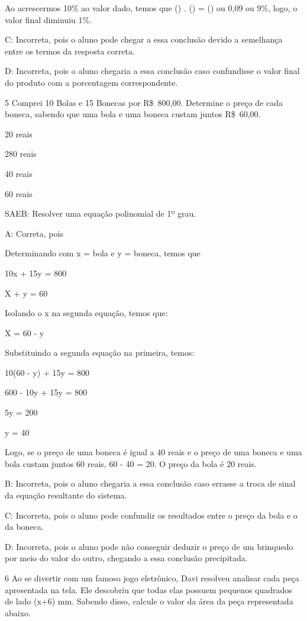 {Ao acrescermos 10\% ao valor dado, temos que () .
() = () ou 0,09 ou 9\%, logo, o valor
final diminuiu 1\%.

C: Incorreta, pois o aluno pode chegar a essa conclusão devido a
semelhança entre os termos da resposta correta.

D: Incorreta, pois o aluno chegaria a essa conclusão caso confundisse o
valor final do produto com a porcentagem correspondente.

\num{5} Comprei 10 Bolas e 15 Bonecas por R\$~800,00. Determine o preço de
cada boneca, sabendo que uma bola e uma boneca custam juntos R\$~60,00.
\item 20 reais
\item 280 reais
\item 40 reais
\item 60 reais

SAEB: Resolver uma equação polinomial de 1º grau.

A: Correta, pois

Determinando com x = bola e y = boneca, temos que

10x + 15y = 800

X + y = 60

Isolando o x na segunda equação, temos que:

X = 60 - y

Substituindo a segunda equação na primeira, temos:

10(60 - y) + 15y = 800

600 - 10y + 15y = 800

5y = 200

y = 40

Logo, se o preço de uma boneca é igual a 40 reais e o preço de uma
boneca e uma bola custam juntos 60 reais, 60 - 40 = 20. O preço da bola
é 20 reais.

B: Incorreta, pois o aluno chegaria a essa conclusão caso errasse a
troca de sinal da equação resultante do sistema.

C: Incorreta, pois o aluno pode confundir os resultados entre o preço da
bola e o da boneca.

D: Incorreta, pois o aluno pode não conseguir deduzir o preço de um
brinquedo por meio do valor do outro, chegando a essa conclusão
precipitada.

\num{6} Ao se divertir com um famoso jogo eletrônico, Davi resolveu analisar
cada peça apresentada na tela. Ele descobriu que todas elas possuem
pequenos quadrados de lado (x+6) mm. Sabendo disso, calcule o valor da
área da peça representada abaixo.

}
